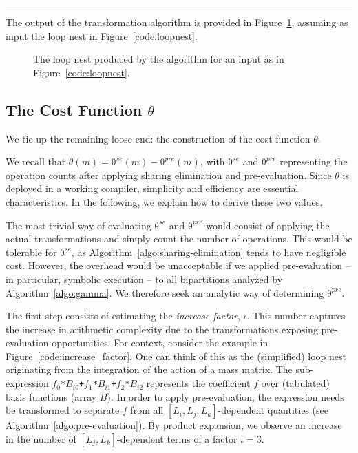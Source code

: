 \noindent\rule[1.0ex]{\linewidth}{0.7pt}

The output of the transformation algorithm is provided in Figure~\ref{code:loopnest-opt}, assuming as input the loop nest in Figure~\ref{code:loopnest}. 

\begin{figure}[h]\begin{CenteredBox}

\end{CenteredBox}\caption{The loop nest produced by the algorithm for an input as in Figure~\ref{code:loopnest}.}\label{code:loopnest-opt}\end{figure}


\subsection{The Cost Function $\theta$}
\label{sec:op_count}
We tie up the remaining loose end: the construction of the cost function $\theta$.

We recall that $\theta(m) = \mathrm{\theta}^{se}(m) - \mathrm{\theta}^{pre}(m)$, with $\mathrm{\theta}^{se}$ and $\mathrm{\theta}^{pre}$ representing the operation counts after applying sharing elimination and pre-evaluation. Since $\theta$ is deployed in a working compiler, simplicity and efficiency are essential characteristics. In the following, we explain how to derive these two values.

The most trivial way of evaluating $\mathrm{\theta}^{se}$ and $\mathrm{\theta}^{pre}$ would consist of applying the actual transformations and simply count the number of operations. This would be tolerable for $\mathrm{\theta}^{se}$, as Algorithm~\ref{algo:sharing-elimination} tends to have negligible cost. However, the overhead would be unacceptable if we applied pre-evaluation -- in particular, symbolic execution -- to all bipartitions analyzed by Algorithm~\ref{algo:gamma}. We therefore seek an analytic way of determining $\mathrm{\theta}^{pre}$.

The first step consists of estimating the \textit{increase factor}, $\iota$. This number captures the increase in arithmetic complexity due to the transformations exposing pre-evaluation opportunities. For context, consider the example in Figure~\ref{code:increase_factor}. One can think of this as the (simplified) loop nest originating from the integration of the action of a mass matrix. The sub-expression \texttt{$f_0$*$B_{i0}$+$f_1$*$B_{i1}$+$f_2$*$B_{i2}$} represents the coefficient $f$ over (tabulated) basis functions (array $B$). In order to apply pre-evaluation, the expression needs be transformed to separate $f$ from all $[L_i, L_j, L_k]$-dependent quantities (see Algorithm~\ref{algo:pre-evaluation}). By product expansion, we observe an increase in the number of $[L_j, L_k]$-dependent terms of a factor $\iota = 3$.

